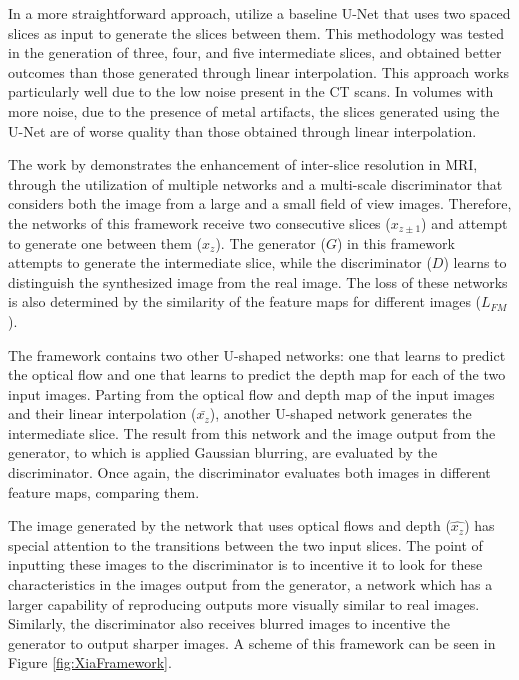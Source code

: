 In a more straightforward approach, \textcite{Nishimoto2024} utilize a baseline U-Net that uses two spaced slices as input to generate the slices between them. This methodology was tested in the generation of three, four, and five intermediate slices, and obtained better outcomes than those generated through linear interpolation. This approach works particularly well due to the low noise present in the CT scans. In volumes with more noise, due to the presence of metal artifacts, the slices generated using the U-Net are of worse quality than those obtained through linear interpolation.
\par
The work by \textcite{Xia2021} demonstrates the enhancement of inter-slice resolution in MRI, through the utilization of multiple networks and a multi-scale discriminator that considers both the image from a large and a small field of view images. Therefore, the networks of this framework receive two consecutive slices ($x_{z\pm1}$) and attempt to generate one between them ($x_{z}$). The generator ($G$) in this framework attempts to generate the intermediate slice, while the discriminator ($D$) learns to distinguish the synthesized image from the real image. The loss of these networks is also determined by the similarity of the feature maps for different images ($L_{FM}$).
\par
The framework contains two other U-shaped networks: one that learns to predict the optical flow and one that learns to predict the depth map for each of the two input images. Parting from the optical flow and depth map of the input images and their linear interpolation ($\bar{x_{z}}$), another U-shaped network generates the intermediate slice. The result from this network and the image output from the generator, to which is applied Gaussian blurring, are evaluated by the discriminator. Once again, the discriminator evaluates both images in different feature maps, comparing them.
\par
The image generated by the network that uses optical flows and depth ($\hat{x_{z}}$) has special attention to the transitions between the two input slices. The point of inputting these images to the discriminator is to incentive it to look for these characteristics in the images output from the generator, a network which has a larger capability of reproducing outputs more visually similar to real images. Similarly, the discriminator also receives blurred images to incentive the generator to output sharper images. A scheme of this framework can be seen in Figure \ref{fig:XiaFramework}.

